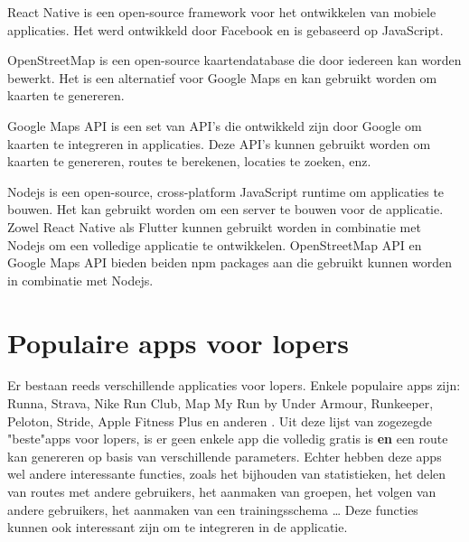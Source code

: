     React Native is een open-source framework voor het ontwikkelen van mobiele applicaties.
    Het werd ontwikkeld door Facebook en is gebaseerd op JavaScript.

    OpenStreetMap is een open-source kaartendatabase die door iedereen kan worden bewerkt.
    Het is een alternatief voor Google Maps en kan gebruikt worden om kaarten te genereren.

    Google Maps API is een set van API's die ontwikkeld zijn door Google om kaarten te integreren in applicaties.
    Deze API's kunnen gebruikt worden om kaarten te genereren, routes te berekenen, locaties te zoeken, enz.

    Nodejs is een open-source, cross-platform JavaScript runtime om applicaties te bouwen. Het kan gebruikt worden om een server te bouwen voor de applicatie.
    Zowel React Native als Flutter kunnen gebruikt worden in combinatie met Nodejs om een volledige applicatie te ontwikkelen.
    OpenStreetMap API en Google Maps API bieden beiden npm packages aan die gebruikt kunnen worden in combinatie met Nodejs.


\section{Populaire apps voor lopers}

Er bestaan reeds verschillende applicaties voor lopers. Enkele populaire apps zijn:
Runna, Strava, Nike Run Club, Map My Run by Under Armour, Runkeeper, Peloton, Stride, Apple Fitness Plus en anderen \autocite{Downey2023}.
Uit deze lijst van zogezegde "beste"\@ apps voor lopers,
is er geen enkele app die volledig gratis is \textbf{en} een route kan genereren op basis van verschillende parameters.
Echter hebben deze apps wel andere interessante functies, zoals het bijhouden van statistieken, het delen van routes met andere gebruikers,
het aanmaken van groepen, het volgen van andere gebruikers, het aanmaken van een trainingsschema \ldots \@
Deze functies kunnen ook interessant zijn om te integreren in de applicatie.




